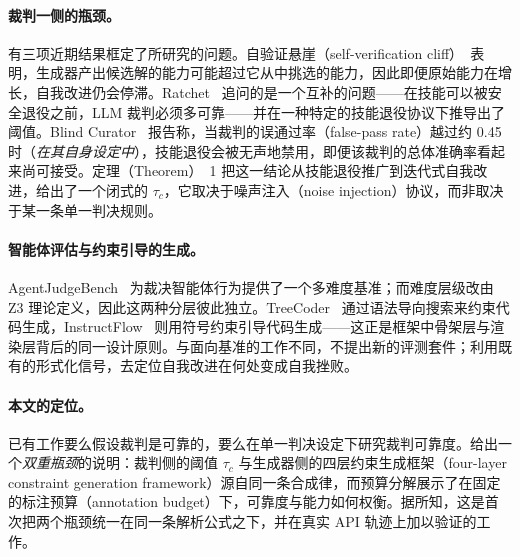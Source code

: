 \documentclass{article}
\begin{document}
\paragraph{裁判一侧的瓶颈。}
有三项近期结果框定了所研究的问题。自验证悬崖（self-verification cliff）~\cite{self_verification_cliff}表明，生成器产出候选解的能力可能超过它从中挑选的能力，因此即便原始能力在增长，自我改进仍会停滞。Ratchet~\cite{ratchet} 追问的是一个互补的问题——在技能可以被安全退役之前，LLM 裁判必须多可靠——并在一种特定的技能退役协议下推导出了阈值。Blind Curator~\cite{blind_curator} 报告称，当裁判的误通过率（false-pass rate）越过约 0.45 时（\textit{在其自身设定中}），技能退役会被无声地禁用，即便该裁判的总体准确率看起来尚可接受。定理（Theorem）~1 把这一结论从技能退役推广到迭代式自我改进，给出了一个闭式的 $\tau_c$，它取决于噪声注入（noise injection）协议，而非取决于某一条单一判决规则。

\paragraph{智能体评估与约束引导的生成。}
AgentJudgeBench~\cite{agentjudgebench} 为裁决智能体行为提供了一个多难度基准；而难度层级改由 Z3 理论定义，因此这两种分层彼此独立。TreeCoder~\cite{treecoder} 通过语法导向搜索来约束代码生成，InstructFlow~\cite{instructflow} 则用符号约束引导代码生成——这正是框架中骨架层与渲染层背后的同一设计原则。与面向基准的工作不同，不提出新的评测套件；利用既有的形式化信号，去定位自我改进在何处变成自我挫败。

\paragraph{本文的定位。}
已有工作要么假设裁判是可靠的，要么在单一判决设定下研究裁判可靠度。给出一个\emph{双重瓶颈}的说明：裁判侧的阈值 $\tau_c$ 与生成器侧的四层约束生成框架（four-layer constraint generation framework）源自同一条合成律，而预算分解展示了在固定的标注预算（annotation budget）下，可靠度与能力如何权衡。据所知，这是首次把两个瓶颈统一在同一条解析公式之下，并在真实 API 轨迹上加以验证的工作。

\end{document}
